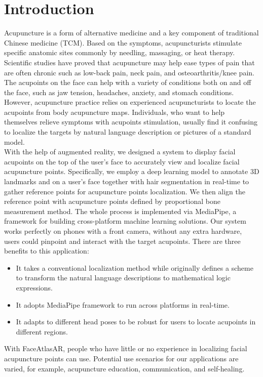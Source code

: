 \section{Introduction}
\label{intro}
Acupuncture\cite{li2015acupoint} is a form of alternative medicine and a key component of traditional Chinese medicine (TCM). Based on the symptoms, acupuncturists stimulate specific anatomic sites commonly by needling, massaging, or heat therapy. Scientific studies have proved that acupuncture may help ease types of pain that are often chronic such as low-back pain, neck pain, and osteoarthritis/knee pain. The acupoints on the face can help with a variety of conditions both on and off the face, such as jaw tension, headaches, anxiety, and stomach conditions.
\\
However, acupuncture practice relies on experienced acupuncturists to locate the acupoints from body acupuncture maps. Individuals, who want to help themselves relieve symptoms with acupoints stimulation, usually find it confusing to localize the targets by natural language description or pictures of a standard model.
\\
With the help of augmented reality, we designed a system to display facial acupoints on the top of the user’s face to accurately view and localize facial acupuncture points. Specifically, we employ a deep learning model to annotate 3D landmarks and on a user’s face together with hair segmentation in real-time to gather reference points for acupuncture points localization. We then align the reference point with acupuncture points defined by proportional bone measurement method. The whole process is implemented via MediaPipe, a framework for building cross-platform machine learning solutions. Our system works perfectly on phones with a front camera, without any extra hardware, users could pinpoint and interact with the target acupoints. There are three benefits to this application:
\begin{itemize}
  \item It takes a conventional localization method while originally defines a scheme to transform the natural language descriptions to mathematical logic expressions.
  \item It adopts MediaPipe framework to run across platforms in real-time.
  \item It adapts to different head poses to be robust for users to locate acupoints in different regions.
\end{itemize}
With FaceAtlasAR, people who have little or no experience in localizing facial acupuncture points can use. Potential use scenarios for our applications are varied, for example, acupuncture education, communication, and self-healing.

